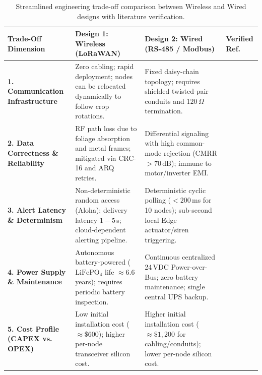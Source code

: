 \documentclass[12pt]{article}
\begin{document}
\begin{table}[H]
\centering
\small
\renewcommand{\arraystretch}{1.3}
\begin{tabularx}{\textwidth}{>{\bfseries}p{2.7cm} X X >{\centering\arraybackslash}p{2.2cm}}
\toprule
Trade-Off Dimension & Design 1: Wireless (LoRaWAN) & Design 2: Wired (RS-485 / Modbus) & Verified Ref. \\
\midrule
1. Communication Infrastructure & 
Zero cabling; rapid deployment; nodes can be relocated dynamically to follow crop rotations. & 
Fixed daisy-chain topology; requires shielded twisted-pair conduits and $120\,\Omega$ termination. & 
\cite{lora_alliance, rs485_standard} \\

2. Data Correctness \& Reliability & 
RF path loss due to foliage absorption and metal frames; mitigated via CRC-16 and ARQ retries. & 
Differential signaling with high common-mode rejection (CMRR $>70\,\text{dB}$); immune to motor/inverter EMI. & 
\cite{rs485_standard, greenhouse_microclimate} \\

3. Alert Latency \& Determinism & 
Non-deterministic random access (Aloha); delivery latency $1 - 5$\,s; cloud-dependent alerting pipeline. & 
Deterministic cyclic polling ($<200$\,ms for 10 nodes); sub-second local Edge actuator/siren triggering. & 
\cite{modbus_org, modbus_agriculture} \\

4. Power Supply \& Maintenance & 
Autonomous battery-powered ($\text{LiFePO}_4$ life $\approx 6.6$\,years); requires periodic battery inspection. & 
Continuous centralized 24\,VDC Power-over-Bus; zero battery maintenance; single central UPS backup. & 
\cite{iot_agri, modbus_agriculture} \\

5. Cost Profile (CAPEX vs. OPEX) & 
Low initial installation cost ($\approx \$600$); higher per-node transceiver silicon cost. & 
Higher initial installation cost ($\approx \$1{,}200$ for cabling/conduits); lower per-node silicon cost. & 
\cite{wsn_review, modbus_agriculture} \\
\bottomrule
\end{tabularx}
\caption{Streamlined engineering trade-off comparison between Wireless and Wired designs with literature verification.}
\label{tab:detailed_tradeoff}
\end{table}
\end{document}
